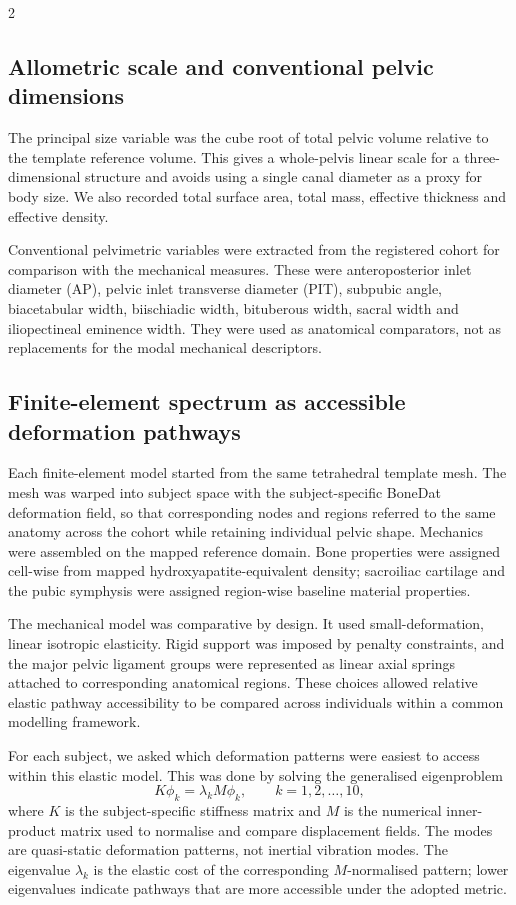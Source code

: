 \documentclass[openacc]{rsproca_new}
\begin{document}
\begin{multicols}{2}
\subsection{Allometric scale and conventional pelvic dimensions}

The principal size variable was the cube root of total pelvic volume relative to the template reference volume. This gives a whole-pelvis linear scale for a three-dimensional structure and avoids using a single canal diameter as a proxy for body size. We also recorded total surface area, total mass, effective thickness and effective density.

Conventional pelvimetric variables were extracted from the registered cohort for comparison with the mechanical measures. These were anteroposterior inlet diameter (AP), pelvic inlet transverse diameter (PIT), subpubic angle, biacetabular width, biischiadic width, bituberous width, sacral width and iliopectineal eminence width. They were used as anatomical comparators, not as replacements for the modal mechanical descriptors.

\subsection{Finite-element spectrum as accessible deformation pathways}

Each finite-element model started from the same tetrahedral template mesh. The mesh was warped into subject space with the subject-specific BoneDat deformation field, so that corresponding nodes and regions referred to the same anatomy across the cohort while retaining individual pelvic shape. Mechanics were assembled on the mapped reference domain. Bone properties were assigned cell-wise from mapped hydroxyapatite-equivalent density; sacroiliac cartilage and the pubic symphysis were assigned region-wise baseline material properties.

The mechanical model was comparative by design. It used small-deformation, linear isotropic elasticity. Rigid support was imposed by penalty constraints, and the major pelvic ligament groups were represented as linear axial springs attached to corresponding anatomical regions. These choices allowed relative elastic pathway accessibility to be compared across individuals within a common modelling framework.

For each subject, we asked which deformation patterns were easiest to access within this elastic model. This was done by solving the generalised eigenproblem
\begin{equation}
K\phi_{k} = \lambda_{k} M\phi_{k}, \qquad k=1,2,\ldots,10,
\end{equation}
where $K$ is the subject-specific stiffness matrix and $M$ is the numerical inner-product matrix used to normalise and compare displacement fields. The modes are quasi-static deformation patterns, not inertial vibration modes. The eigenvalue $\lambda_k$ is the elastic cost of the corresponding $M$-normalised pattern; lower eigenvalues indicate pathways that are more accessible under the adopted metric.


\end{multicols}
\end{document}
